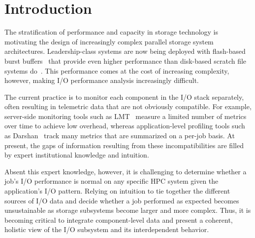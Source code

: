 \section{Introduction} \label{sec:introduction}

The stratification of performance and capacity in storage technology is motivating the design of increasingly complex parallel storage system architectures.
Leadership-class systems are now being deployed with flash-based burst buffers~\cite{Henseler2016} that provide even higher performance than disk-based scratch file systems do~\cite{Bhimji2016}.
This performance comes at the cost of increasing complexity, however, making I/O performance analysis increasingly difficult.

The current practice is to monitor each component in the I/O stack separately, often resulting in telemetric data that are not obviously compatible.
For example, server-side monitoring tools such as LMT~\cite{lmt} measure a limited number of metrics over time to achieve low overhead, whereas application-level profiling tools such as Darshan~\cite{carns200924} track many metrics that are summarized on a per-job basis.
At present, the gaps of information resulting from these incompatibilities are filled by expert institutional knowledge and intuition.

Absent this expert knowledge, however, it is challenging to determine whether a job's I/O performance is normal on any specific HPC system given the application's I/O pattern.
Relying on intuition to tie together the different sources of I/O data and decide whether a job performed as expected becomes unsustainable as storage subsystems become larger and more complex.  
Thus, it is becoming critical to integrate component-level data and present a coherent, holistic view of the I/O subsystem and its interdependent behavior.

